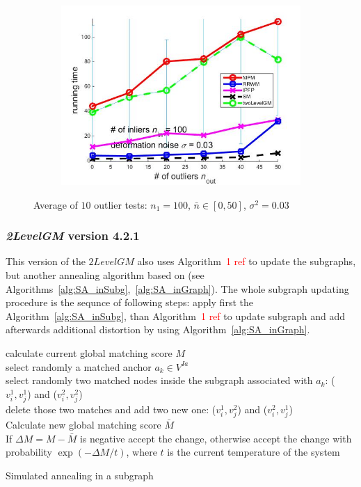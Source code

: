\documentclass[
	fontsize=12pt,
	paper=a4,
	twoside=false,
	numbers=noenddot,
	plainheadsepline,
	toc=listof,
	toc=bibliography
]{scrartcl}
\newcommand\ToDo[1]{\textcolor{red}{#1}}
\begin{document}
\begin{figure}[h]
\begin{subfigure}[b]{0.3\textwidth}
		\includegraphics[scale=0.25]{"fig_ver2608/syntheticPointSets/ver4.2/outliertest_n50/time_avg10t"} 
	\end{subfigure} 	
	\caption{Average of $10$ outlier tests: $n_1=100$, $\bar{n}\in[0,50]$, $\sigma^2=0.03$}
	\label{fig:test3_ver42}
\end{figure}

\FloatBarrier

\subsubsection{\emph{2LevelGM} version 4.2.1}

This version of the $2LevelGM$ also uses Algorithm~\ToDo{1 ref} to update the subgraphs, but another annealing algorithm based on \cite{herault1990_SA} (see Algorithms~\ref{alg:SA_inSubg},~\ref{alg:SA_inGraph}). The whole subgraph updating procedure is the sequnce of following steps: apply first the Algorithm~\ref{alg:SA_inSubg}, than Algorithm~\ToDo{1 ref} to update subgraph and add afterwards additional distortion by using Algorithm~\ref{alg:SA_inGraph}.

\vspace{10pt}
\begin{algorithm}[H]
	\nl calculate current global matching score $M$ \\
	\nl select randomly a matched anchor $a_k\in V^{Ia}$ \\
	\nl select randomly two matched nodes inside the subgraph associated with $a_k$: ($v^1_i, v^1_j$) and
	($v^2_i, v^2_j$) \\
	\nl delete those two matches and add two new one: ($v^1_i, v^2_j$) and ($v^2_i, v^1_j$) \\
	\nl Calculate new global matching score $\bar{M}$ \\
	\nl If $\Delta M = M - \bar{M}$ is negative accept the change, otherwise accept the change with probability $\exp(-\Delta M/t)$, where $t$ is the current temperature of the system
	\caption{Simulated annealing in a subgraph}    \label{alg:SA_inSubg}
\end{algorithm}
\end{document}
